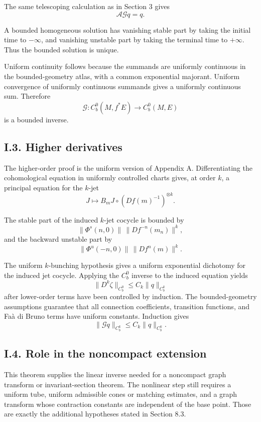 \documentclass[12pt,a4paper]{article}
\theoremstyle{plain}
\numberwithin{equation}{section}
\numberwithin{theorem}{section}
\begin{document}
The same telescoping calculation as in Section 3 gives
\[
\mathcal A\mathcal Gq=q.
\]

A bounded homogeneous solution has vanishing stable part by taking the initial time to $-\infty$, and vanishing unstable part by taking the terminal time to $+\infty$. Thus the bounded solution is unique.

Uniform continuity follows because the summands are uniformly continuous in the bounded-geometry atlas, with a common exponential majorant. Uniform convergence of uniformly continuous summands gives a uniformly continuous sum. Therefore
\[
\mathcal G:C_b^0(M,f^*E)
\to
C_b^0(M,E)
\]
is a bounded inverse.

\subsection{I.3. Higher derivatives}

The higher-order proof is the uniform version of Appendix A. Differentiating the cohomological equation in uniformly controlled charts gives, at order $k$, a principal equation for the $k$-jet
\[
J\mapsto B_mJ\circ(Df(m)^{-1})^{\otimes k}.
\]

The stable part of the induced $k$-jet cocycle is bounded by
\[
\|\Phi^s(n,0)\|\,\|Df^{-n}(m_n)\|^k,
\]
and the backward unstable part by
\[
\|\Phi^u(-n,0)\|\,\|Df^n(m)\|^k.
\]

The uniform $k$-bunching hypothesis gives a uniform exponential dichotomy for the induced jet cocycle. Applying the $C_b^0$ inverse to the induced equation yields
\[
\|D^k\zeta\|_{C_b^0}
\le C_k\|q\|_{C_b^k}
\]
after lower-order terms have been controlled by induction. The bounded-geometry assumptions guarantee that all connection coefficients, transition functions, and Faà di Bruno terms have uniform constants. Induction gives
\[
\|\mathcal Gq\|_{C_b^k}
\le C_k\|q\|_{C_b^k}.
\]

\subsection{I.4. Role in the noncompact extension}

This theorem supplies the linear inverse needed for a noncompact graph transform or invariant-section theorem. The nonlinear step still requires a uniform tube, uniform admissible cones or matching estimates, and a graph transform whose contraction constants are independent of the base point. Those are exactly the additional hypotheses stated in Section 8.3.
\end{document}

